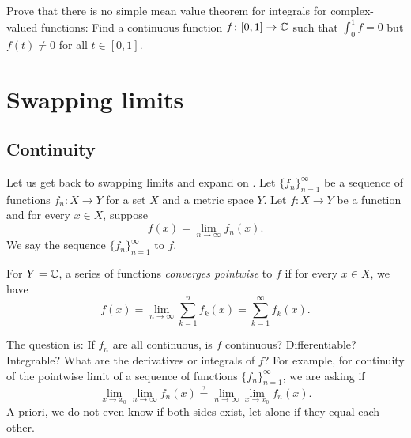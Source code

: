 \begin{exercise}
Prove that there is no simple mean value theorem for integrals
for complex-valued
functions:  Find a continuous function $f \colon [0,1] \to {\mathbb{C}}$ such that
$\int_0^1 f = 0$ but $f(t) \neq 0$ for all $t \in [0,1]$.
\end{exercise}



\sectionnewpage
\section{Swapping limits}
\label{sec:swaplim}



\subsection{Continuity}

Let us get back to swapping limits and expand on
.
Let $\{ f_n \}_{n=1}^\infty$ be a sequence
of functions $f_n \colon X \to Y$ for a set $X$ and a metric space $Y$.
Let $f \colon X \to Y$ be a
function and for every $x \in X$, suppose
\begin{equation*}
f(x) = \lim_{n\to \infty} f_n(x) .
\end{equation*}
We say the sequence $\{ f_n \}_{n=1}^\infty$
\emph{} to $f$.

For $Y={\mathbb{C}}$, a series of functions
\emph{converges pointwise} to $f$ if
for every $x \in X$, we have
\begin{equation*}
f(x) = \lim_{n\to \infty} \sum_{k=1}^n f_k(x) =
\sum_{k=1}^\infty f_k(x) .
\end{equation*}

\medskip

The question is:
If $f_n$ are all continuous, is $f$ continuous?  Differentiable?
Integrable?  What are the derivatives or integrals of $f$?
For example, for continuity of the pointwise limit of a sequence
of functions
$\{ f_n \}_{n=1}^\infty$, we are asking if
\begin{equation*}
\lim_{x\to x_0} \lim_{n\to\infty} f_n(x)
\overset{?}{=}
\lim_{n\to\infty} \lim_{x\to x_0} f_n(x) .
\end{equation*}
A priori, we do not even know if both sides exist, let alone if they equal each other.


